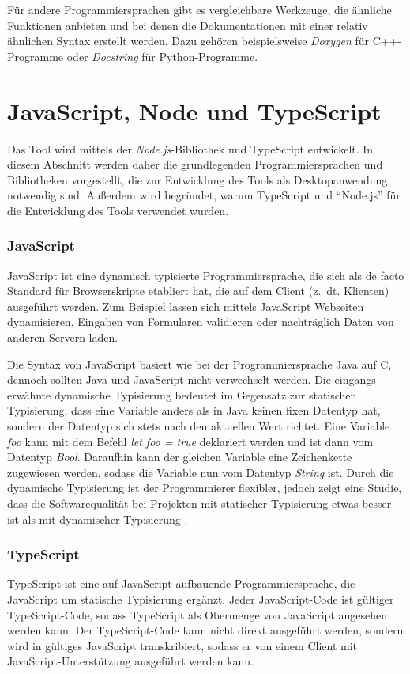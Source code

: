 Für andere Programmiersprachen gibt es vergleichbare Werkzeuge, die ähnliche Funktionen anbieten und bei denen die Dokumentationen mit einer relativ ähnlichen Syntax erstellt werden. Dazu gehören beispielsweise \textit{Doxygen} \cite{doxygen} für C++-Programme oder \textit{Docstring} \cite{docstring} für Python-Programme. 


\section{JavaScript, Node und TypeScript}
Das Tool wird mittels der \textit{Node.js}-Bibliothek und TypeScript entwickelt.
In diesem Abschnitt werden daher die grundlegenden Programmiersprachen und Bibliotheken vorgestellt, die zur Entwicklung des Tools als Desktopanwendung notwendig sind. Außerdem wird begründet, warum TypeScript und \enquote{Node.js} für die Entwicklung des Tools verwendet wurden. 
\subsubsection{JavaScript}
JavaScript ist eine dynamisch typisierte Programmiersprache, die sich als de facto Standard  für Browserskripte etabliert hat, die auf dem Client (z.~dt. Klienten) ausgeführt werden. Zum Beispiel lassen sich mittels JavaScript Webseiten dynamisieren, Eingaben von Formularen validieren oder nachträglich Daten von anderen Servern laden. 

Die Syntax von JavaScript basiert wie bei der Programmiersprache Java auf C, dennoch sollten Java und JavaScript nicht verwechselt werden. Die eingangs erwähnte dynamische Typisierung bedeutet im Gegensatz zur statischen Typisierung, dass eine Variable anders als in Java keinen fixen Datentyp hat, sondern der Datentyp sich stets nach den aktuellen Wert richtet. Eine Variable \textit{foo} kann mit dem Befehl \textit{ let foo = true} deklariert werden und ist dann vom Datentyp \textit{Bool}. Daraufhin kann der gleichen Variable eine Zeichenkette zugewiesen werden, sodass die Variable nun vom Datentyp \textit{String} ist. Durch die dynamische Typisierung ist der Programmierer flexibler, jedoch zeigt eine Studie, dass die Softwarequalität bei Projekten mit statischer Typisierung etwas besser ist als mit dynamischer Typisierung \cite[S.~155ff.]{Ray2014}.

\subsubsection{TypeScript}
TypeScript ist eine auf JavaScript aufbauende Programmiersprache, die JavaScript um statische Typisierung ergänzt. Jeder JavaScript-Code ist gültiger TypeScript-Code, sodass TypeScript als Obermenge von JavaScript angesehen werden kann. Der TypeScript-Code kann nicht direkt ausgeführt werden, sondern wird in gültiges JavaScript transkribiert, sodass er von einem Client mit JavaScript-Unterstützung ausgeführt werden kann. 

